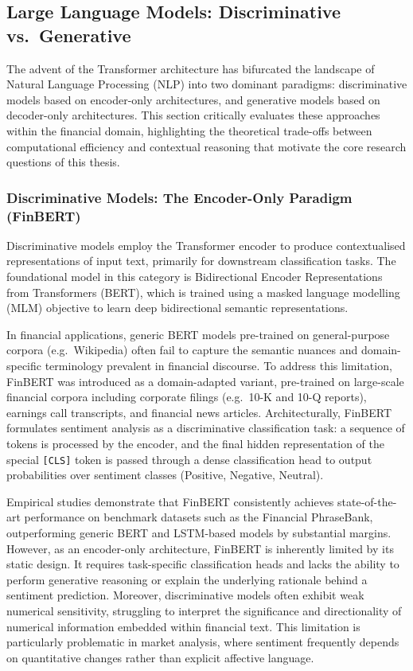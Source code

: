 \documentclass[singlespace]{ucetd}
\begin{document}
\subsection{Large Language Models: Discriminative vs.\ Generative}

The advent of the Transformer architecture has bifurcated the landscape of Natural Language Processing (NLP) into two dominant paradigms: discriminative models based on encoder-only architectures, and generative models based on decoder-only architectures. This section critically evaluates these approaches within the financial domain, highlighting the theoretical trade-offs between computational efficiency and contextual reasoning that motivate the core research questions of this thesis.

\subsubsection{Discriminative Models: The Encoder-Only Paradigm (FinBERT)}

Discriminative models employ the Transformer encoder to produce contextualised representations of input text, primarily for downstream classification tasks. The foundational model in this category is Bidirectional Encoder Representations from Transformers (BERT), which is trained using a masked language modelling (MLM) objective to learn deep bidirectional semantic representations.

In financial applications, generic BERT models pre-trained on general-purpose corpora (e.g.\ Wikipedia) often fail to capture the semantic nuances and domain-specific terminology prevalent in financial discourse. To address this limitation, FinBERT was introduced as a domain-adapted variant, pre-trained on large-scale financial corpora including corporate filings (e.g.\ 10-K and 10-Q reports), earnings call transcripts, and financial news articles. Architecturally, FinBERT formulates sentiment analysis as a discriminative classification task: a sequence of tokens is processed by the encoder, and the final hidden representation of the special \texttt{[CLS]} token is passed through a dense classification head to output probabilities over sentiment classes (Positive, Negative, Neutral).

Empirical studies demonstrate that FinBERT consistently achieves state-of-the-art performance on benchmark datasets such as the Financial PhraseBank, outperforming generic BERT and LSTM-based models by substantial margins. However, as an encoder-only architecture, FinBERT is inherently limited by its static design. It requires task-specific classification heads and lacks the ability to perform generative reasoning or explain the underlying rationale behind a sentiment prediction. Moreover, discriminative models often exhibit weak numerical sensitivity, struggling to interpret the significance and directionality of numerical information embedded within financial text. This limitation is particularly problematic in market analysis, where sentiment frequently depends on quantitative changes rather than explicit affective language.
\end{document}
